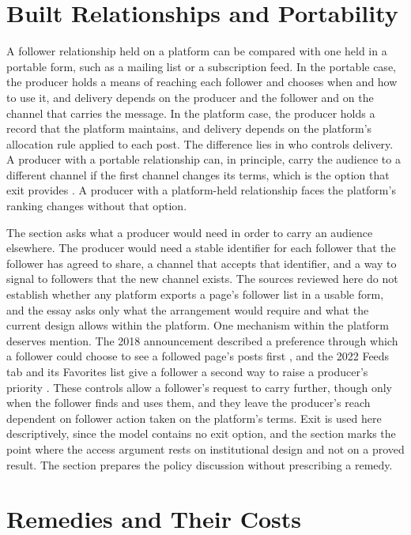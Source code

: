 \documentclass[11pt]{article}
\theoremstyle{definition}
\begin{document}
\section{Built Relationships and Portability}

A follower relationship held on a platform can be compared with one held in a portable form, such as a mailing list or a subscription feed. In the portable case, the producer holds a means of reaching each follower and chooses when and how to use it, and delivery depends on the producer and the follower and on the channel that carries the message. In the platform case, the producer holds a record that the platform maintains, and delivery depends on the platform's allocation rule applied to each post. The difference lies in who controls delivery. A producer with a portable relationship can, in principle, carry the audience to a different channel if the first channel changes its terms, which is the option that exit provides \cite{hirschman1970}. A producer with a platform-held relationship faces the platform's ranking changes without that option.

The section asks what a producer would need in order to carry an audience elsewhere. The producer would need a stable identifier for each follower that the follower has agreed to share, a channel that accepts that identifier, and a way to signal to followers that the new channel exists. The sources reviewed here do not establish whether any platform exports a page's follower list in a usable form, and the essay asks only what the arrangement would require and what the current design allows within the platform. One mechanism within the platform deserves mention. The 2018 announcement described a preference through which a follower could choose to see a followed page's posts first \cite{mosseri2018}, and the 2022 Feeds tab and its Favorites list give a follower a second way to raise a producer's priority \cite{meta2022}. These controls allow a follower's request to carry further, though only when the follower finds and uses them, and they leave the producer's reach dependent on follower action taken on the platform's terms. Exit is used here descriptively, since the model contains no exit option, and the section marks the point where the access argument rests on institutional design and not on a proved result. The section prepares the policy discussion without prescribing a remedy.

\section{Remedies and Their Costs}
\end{document}
